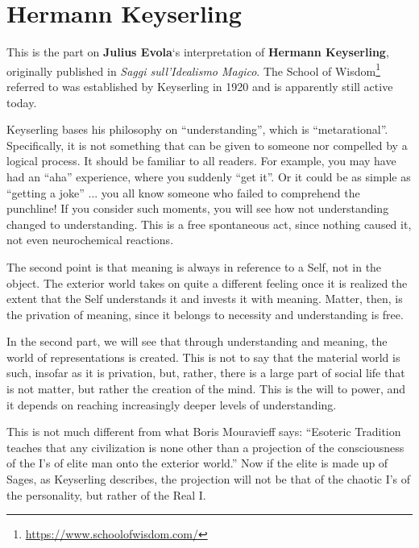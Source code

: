 \section{Hermann Keyserling}

\begin{quotationx}
This is the part on \textbf{Julius Evola}`s interpretation of \textbf{Hermann Keyserling}, originally published in \emph{Saggi sull'Idealismo Magico}. The School of Wisdom\footnote{\url{https://www.schoolofwisdom.com/}} referred to was established by Keyserling in 1920 and is apparently still active today.

Keyserling bases his philosophy on ``understanding'', which is ``metarational''. Specifically, it is not something that can be given to someone nor compelled by a logical process. It should be familiar to all readers. For example, you may have had an ``aha'' experience, where you suddenly ``get it''. Or it could be as simple as ``getting a joke'' ... you all know someone who failed to comprehend the punchline! If you consider such moments, you will see how not understanding changed to understanding. This is a free spontaneous act, since nothing caused it, not even neurochemical reactions.

The second point is that meaning is always in reference to a Self, not in the object. The exterior world takes on quite a different feeling once it is realized the extent that the Self understands it and invests it with meaning. Matter, then, is the privation of meaning, since it belongs to necessity and understanding is free.

In the second part, we will see that through understanding and meaning, the world of representations is created. This is not to say that the material world is such, insofar as it is privation, but, rather, there is a large part of social life that is not matter, but rather the creation of the mind. This is the will to power, and it depends on reaching increasingly deeper levels of understanding.

This is not much different from what Boris Mouravieff says: ``Esoteric Tradition teaches that any civilization is none other than a projection of the consciousness of the I's of elite man onto the exterior world.'' Now if the elite is made up of Sages, as Keyserling describes, the projection will not be that of the chaotic I's of the personality, but rather of the Real I.

\end{quotationx}


